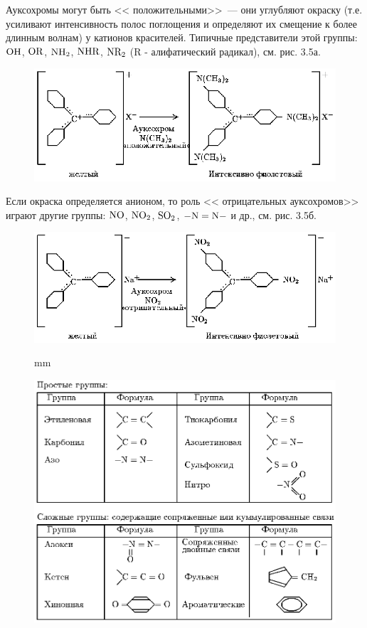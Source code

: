 Ауксохромы могут быть << положительными>>\ --- они углубляют
окраску (т.е. усиливают интенсивность полос поглощения и
определяют их смещение к более длинным волнам) у катионов
красителей. Типичные представители этой группы: $\rm OH$, $\rm
OR$, $\rm NH_2$, $\rm NHR$, $\rm NR_2$ (R - алифатический
радикал), см. рис. 3.5а.
\begin{figure}[tbp]
\centerline{\hbox{\includegraphics[scale=0.9]{Ris/ris_eps/ris3_05b.eps}}}
\end{figure}

Если окраска определяется анионом, то
роль << отрицательных ауксохромов>> играют другие группы: $\rm
NO$, $\rm NO_2$, $\rm SO_2$, $\rm -N=N-$ и др., см. рис. 3.5б.

\begin{figure}[tbp]
\centerline{\hbox{\includegraphics[scale=0.9]{Ris/ris_eps/ris3_05c.eps}}}
\end{figure}


\begin{figure}[tbp]
 mm
\centerline{\hbox{\includegraphics[scale=0.9]{Ris/ris_eps/ris3_05d.eps}}}
\end{figure}

